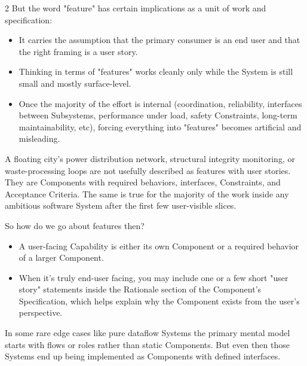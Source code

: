 \begin{multicols}{2}
But the word "feature" has certain implications as a unit of work and specification:

\begin{itemize}\setlength{\itemsep}{0pt}\setlength{\parskip}{0pt}

\item It carries the assumption that the primary consumer is an end user and that the right framing is a user story.

\item Thinking in terms of "features" works cleanly only while the System is still small and mostly surface-level.

\item Once the majority of the effort is internal (coordination, reliability, interfaces between Subsystems, performance under load, safety Constraints, long-term maintainability, etc), forcing everything into "features" becomes artificial and misleading.

\end{itemize}

A floating city’s power distribution network, structural integrity monitoring, or waste-processing loops are not usefully described as features with user stories. They are Components with required behaviors, interfaces, Constraints, and Acceptance Criteria. The same is true for the majority of the work inside any ambitious software System after the first few user-visible slices.

So how do we go about features then?

\begin{itemize}\setlength{\itemsep}{0pt}\setlength{\parskip}{0pt}

\item A user-facing Capability is either its own Component or a required behavior of a larger Component.

\item When it's truly end-user facing, you may include one or a few short "user story" statements inside the Rationale section of the Component's Specification, which helps explain why the Component exists from the user's perspective.

\end{itemize}

In some rare edge cases like pure dataflow Systems the primary mental model starts with flows or roles rather than static Components. But even then those Systems end up being implemented as Components with defined interfaces.


\end{multicols}

